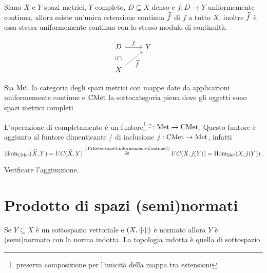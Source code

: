 \begin{proposition}\label{PrEstensioneUniformementeContinue}
Siano $X$ e $Y$ spazi metrici, $Y$ completo, $D\subseteq X$ denso e $f:D\to Y$ uniformemente continua, allora esiste un'unica estensione continua $\widetilde{f}$ di $f$ a tutto $X$, inoltre $\widetilde{f}$ \`e essa stessa uniformemente continua con lo stesso modulo di continuit\`a.

\[\begin{tikzcd}
	D & Y \\
	X
	\arrow["f", from=1-1, to=1-2]
	\arrow["\subseteq"{marking, allow upside down}, draw=none, from=1-1, to=2-1]
	\arrow["{\wt f}"', dashed, from=2-1, to=1-2]
\end{tikzcd}\]
\end{proposition}

\begin{definition}
Sia $\mathrm{Met}$ la categoria degli spazi metrici con mappe date da applicazioni uniformemente continue e $\mathrm{CMet}$ la sottocategoria piena dove gli oggetti sono spazi metrici completi
\end{definition}

\begin{remark}
L'operazione di completamento \`e un funtore\footnote{preserva composizione per l'unicit\`a della mappa tra estensioni} $\widetilde{\cdot}:\mathrm{Met}\to \mathrm{CMet}$. Questo funtore \`e aggiunto al funtore dimenticante / di inclusione $j:\mathrm{CMet}\to \mathrm{Met}$, infatti
\[\operatorname{Hom}_{\mathrm{CMet}}(\widetilde{X},Y)=UC(\widetilde{X},Y)\overset{\text{(\ref{PrEstensioneUniformementeContinue})}}{\cong} UC(X,j(Y))=\operatorname{Hom}_{\mathrm{Met}}(X,j(Y)).\]
\end{remark}

\begin{exercise}
Verificare l'aggiunzione.
\end{exercise}


\section{Prodotto di spazi (semi)normati}
\begin{remark}
Se $Y\subseteq X$ \`e un sottospazio vettoriale e $(X,\left\Vert{\cdot}\right\Vert)$ \`e normato allora $Y$ \`e (semi)normato con la norma indotta. La topologia indotta \`e quella di sottospazio
\end{remark}

